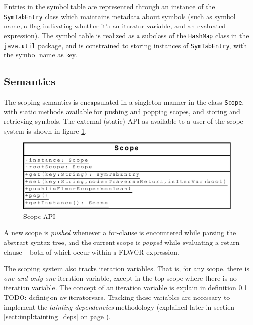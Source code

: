 Entries in the symbol table are represented through an instance of the
\texttt{SymTabEntry} class which maintains metadata about symbols (such as
symbol name, a flag indicating whether it's an iterator variable, and an
evaluated expression). The symbol table is realized as a subclass of the
\texttt{HashMap} class in the \texttt{java.util} package, and is constrained to
storing instances of \texttt{SymTabEntry}, with the symbol name as key.

\subsection{Semantics}
The scoping semantics is encapsulated in a singleton manner in the class
\texttt{Scope}, with static methods available for pushing and popping scopes,
and storing and retrieving symbols. The external (static) API as available to a
user of the scope system is shown in figure \ref{fig:impl:scope_uml}.

\begin{figure}[!htp]
\begin{center}
  \includegraphics[scale=0.5]{diagrams/scope_uml}
  \caption{Scope API}
  \label{fig:impl:scope_uml}
\end{center}
\end{figure}

A new scope is \textit{pushed} whenever a for-clause is encountered while
parsing the abstract syntax tree, and the current scope is \textit{popped} while
evaluating a return clause -- both of which occur within a FLWOR expression.

The scoping system also tracks iteration variables. That is, for any scope,
there is \textit{one and only one} iteration variable, except in the top scope
where there is no iteration variable. The concept of an iteration variable is
explain in definition \ref{} TODO: definisjon av iteratorvars. Tracking these
variables are necessary to implement the \textit{tainting dependencies} methodology (explained
later in section \ref{sect:impl:tainting_deps} on page
\pageref{sect:impl:tainting_deps}).